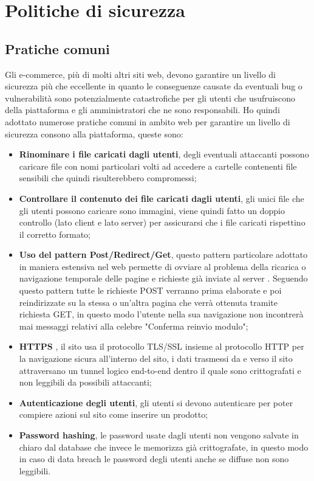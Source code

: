\section{Politiche di sicurezza}
\subsection{Pratiche comuni}
Gli e-commerce, più di molti altri siti web, devono garantire un livello di sicurezza più che eccellente in quanto le conseguenze causate da eventuali bug o vulnerabilità sono potenzialmente catastrofiche per gli utenti che usufruiscono della piattaforma e gli amministratori che ne sono responsabili. Ho quindi adottato numerose pratiche comuni in ambito web per garantire un livello di sicurezza consono alla piattaforma, queste sono: 
\begin{itemize}
    \item \textbf{Rinominare i file caricati dagli utenti}, degli eventuali attaccanti possono caricare file con nomi particolari volti ad accedere a cartelle contenenti file sensibili che quindi risulterebbero compromessi; 
    \item \textbf{Controllare il contenuto dei file caricati dagli utenti}, gli unici file che gli utenti possono caricare sono immagini, viene quindi fatto un doppio controllo (lato client e lato server) per assicurarsi che i file caricati rispettino il corretto formato; 
    \item \textbf{Uso del pattern Post/Redirect/Get}, questo pattern particolare adottato in maniera estensiva nel web permette di ovviare al problema della ricarica o navigazione temporale delle pagine e richieste già inviate al server \cite{PRG}. Seguendo questo pattern tutte le richieste POST verranno prima elaborate e poi reindirizzate su la stessa o un'altra pagina che verrà ottenuta tramite richiesta GET, in questo modo l'utente nella sua navigazione non incontrerà mai messaggi relativi alla celebre "Conferma reinvio modulo"; 
    \item \textbf{HTTPS} \cite{HTTPS}, il sito usa il protocollo TLS/SSL insieme al protocollo HTTP per la navigazione sicura all'interno del sito, i dati trasmessi da e verso il sito attraversano un tunnel logico end-to-end dentro il quale sono crittografati e non leggibili da possibili attaccanti; 
    \item \textbf{Autenticazione degli utenti}, gli utenti si devono autenticare per poter compiere azioni sul sito come inserire un prodotto; 
    \item \textbf{Password hashing}, le password usate dagli utenti non vengono salvate in chiaro dal database che invece le memorizza già crittografate, in questo modo in caso di data breach le password degli utenti anche se diffuse non sono leggibili.  
\end{itemize} 
